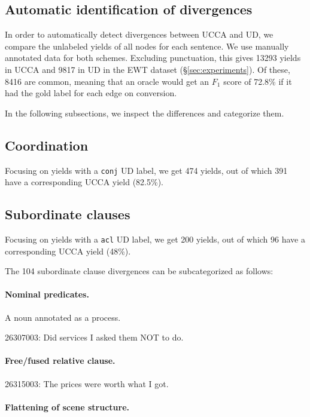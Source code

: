\documentclass[11pt,a4paper]{article}
\begin{document}
\subsection{Automatic identification of divergences}

In order to automatically detect divergences between UCCA and UD,
we compare the unlabeled yields of all nodes for each sentence.
We use manually annotated data for both schemes.
Excluding punctuation, this gives 13293 yields in UCCA and
9817 in UD in the EWT dataset (\S\ref{sec:experiments}).
Of these, 8416 are common, meaning that an oracle would get an $F_1$ score
of 72.8\% if it had the gold label for each edge on conversion.

In the following subsections, we inspect the differences and categorize them.

\subsection{Coordination}
Focusing on yields with a \verb|conj| UD label,
we get 474 yields, out of which 391 have a corresponding UCCA yield (82.5\%).

\subsection{Subordinate clauses}
Focusing on yields with a \verb|acl| UD label,
we get 200 yields, out of which 96 have a corresponding UCCA yield (48\%).

The 104 subordinate clause divergences can be subcategorized as follows:

\paragraph{Nominal predicates.}

A noun annotated as a process.

26307003:
Did services I asked them NOT to do.

\paragraph{Free/fused relative clause.}

26315003:
The prices were worth what I got.

\paragraph{Flattening of scene structure.}
\end{document}
